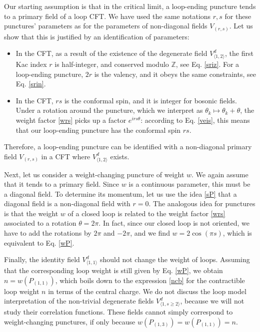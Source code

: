 \documentclass[12pt, a4paper]{article}
\theoremstyle{break}
\begin{document}
Our starting assumption is that in the critical limit, a loop-ending puncture tends to a primary field of a loop CFT. We have used the same notations $r,s$ for these punctures' parameters as for the parameters of non-diagonal fields $V_{(r,s)}$. Let us show that this is justified by an identification of parameters:
\begin{itemize}
 \item In the CFT, as a result of the existence of the degenerate field $V^d_{\langle 1,2\rangle}$, the first Kac index $r$ is half-integer, and conserved modulo $\mathbb{Z}$, see Eq. \eqref{sriz}. For a loop-ending puncture, $2r$ is the valency, and it obeys the same constraints, see Eq. \eqref{srin}.
 \item In the CFT, $rs$ is the conformal spin, and it is integer for bosonic fields. Under a rotation around the puncture, which we interpret as $\theta_k\mapsto \theta_k + \theta$, the weight factor \eqref{wrs} picks up a factor $e^{irs\theta}$: according to Eq. \eqref{veis}, this means that our loop-ending puncture has the conformal spin $rs$. 
\end{itemize}
Therefore, a loop-ending puncture can be identified with a non-diagonal primary field $V_{(r,s)}$ in a CFT where $V^d_{\langle 1,2\rangle}$ exists. 

Next, let us consider a weight-changing puncture of weight $w$. We again assume that it tends to a primary field. Since $w$ is a continuous parameter, this must be a diagonal field. To determine its momentum, let us use the idea \eqref{sP} that a diagonal field is a non-diagonal field with $r=0$. The analogous idea for punctures is that the weight $w$ of a closed loop is related to the weight factor \eqref{wrs} associated to a rotation $\theta = 2\pi$. In fact, since our closed loop is not oriented, we have to add the rotations by $2\pi$ and $-2\pi$, and we find $w=2\cos(\pi s)$, which is equivalent to Eq. \eqref{wP}. 

Finally, the identity field $V^d_{\langle 1,1\rangle}$ should not change the weight of loops. Assuming that 
the corresponding loop weight is still given by Eq. \eqref{wP}, we obtain 
$n=w(P_{(1,1)})$, which boils down to the expression \eqref{ncb} for the contractible loop weight $n$ in terms of the central charge. We do not discuss the loop model interpretation of the non-trivial degenerate fields $V^d_{\langle 1,s\geq 2\rangle}$, because we will not study their correlation functions. These fields cannot simply correspond to weight-changing punctures, if only because $w(P_{(1,3)})=w(P_{(1,1)})=n$. 
\end{document}
